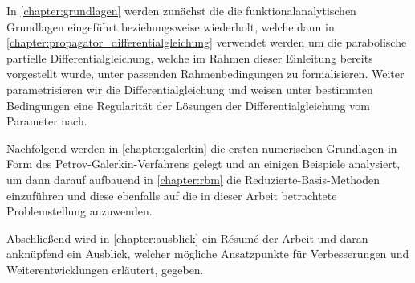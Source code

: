 \documentclass[../main.tex]{subfiles}
\begin{document}
In \cref{chapter:grundlagen} werden zunächst die die funktionalanalytischen Grundlagen eingeführt beziehungsweise wiederholt, welche dann in \cref{chapter:propagator_differentialgleichung} verwendet werden um die parabolische partielle Differentialgleichung, welche im Rahmen dieser Einleitung bereits vorgestellt wurde, unter passenden Rahmenbedingungen zu formalisieren.
Weiter parametrisieren wir die Differentialgleichung und weisen unter bestimmten Bedingungen eine Regularität der Lösungen der Differentialgleichung vom Parameter nach.

Nachfolgend werden in \cref{chapter:galerkin} die ersten numerischen Grundlagen in Form des Petrov-Galerkin-Verfahrens gelegt und an einigen Beispiele analysiert, um dann darauf aufbauend in \cref{chapter:rbm} die Reduzierte-Basis-Methoden einzuführen und diese ebenfalls auf die in dieser Arbeit betrachtete Problemstellung anzuwenden.

Abschließend wird in \cref{chapter:ausblick} ein Résumé der Arbeit und daran anknüpfend ein Ausblick, welcher mögliche Ansatzpunkte für Verbesserungen und Weiterentwicklungen erläutert, gegeben.
\end{document}
